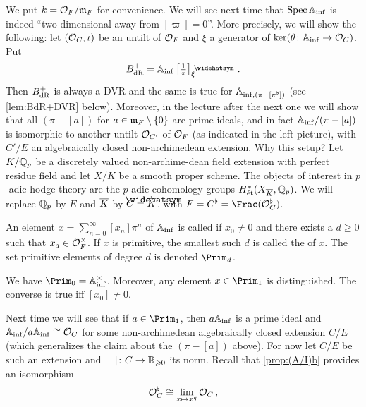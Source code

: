 We put $k=\mathcal{O}_F/\mathfrak{m}_F$ for convenience. We will see next time that $\operatorname{Spec}\mathbb{A}_{\mathrm{inf}}$ is indeed \enquote{two-dimensional away from $[\varpi]=0$}. More precisely, we will show the following: let $(\mathcal{O}_C,\iota)$ be an untilt of $\mathcal{O}_F$ and $\xi$ a generator of $\ker(\theta\colon \IA_\inf\morphism \Oo_C)$. Put
\begin{equation*}
	B_\dR^+=\IA_\inf\left[\textstyle \frac 1\pi\right]_\xi^\complete\,.
\end{equation*}
Then $B_{\mathrm{dR}}^+$ is always a DVR and the same is true for $\mathbb{A}_{\mathrm{inf},(\pi-[\pi^\flat])}$ (see \cref{lem:BdR+DVR} below). Moreover, in the lecture after the next one we will show that all $(\pi-[a])$ for $a\in\mathfrak{m}_F\setminus\{0\}$ are prime ideals, and in fact $\mathbb{A}_{\mathrm{inf}}/(\pi-[a])$ is isomorphic to another untilt $\mathcal{O}_{C'}$ of $\mathcal{O}_F$ (as indicated in the left picture), with $C'/E$ an algebraically closed non-archimedean extension.
Why this setup? Let $K/\mathbb{Q}_p$ be a discretely valued non-archime-dean field extension with perfect residue field and let $X/K$ be a smooth proper scheme.  The objects of interest in $p$-adic hodge theory are the $p$-adic cohomology groups $H_\et^*(X_{\ov{K}},\IQ_p)$. We will replace $\mathbb{Q}_p$ by $E$ and $\ov{K}$ by $C=\roof{\ov{K}}$, with $F=C^\flat=\Frac(\Oo_C^\flat)$.
\begin{defi}
	An element $x=\sum_{n=0}^\infty [x_n]\pi^n$ of $\mathbb{A}_{\mathrm{inf}}$ is called  if $x_0\neq 0$ and there exists a $d\geq 0$ such that $x_d\in \mathcal{O}_F^\times$. If $x$ is primitive, the smallest such $d$ is called the  of $x$. The set primitive elements of degree $d$ is denoted $\Prim_d$.
\end{defi}
\begin{exm}
	We have $\Prim_0=\IA_\inf^\times$. Moreover, any element $x\in \Prim_1$ is distinguished. The converse is true iff $[x_0]\neq 0$.
\end{exm}
Next time we will see that if $a\in \Prim_1$, then $a\mathbb{A}_{\mathrm{inf}}$ is  a prime ideal and $\mathbb{A}_{\mathrm{inf}}/a\mathbb{A}_{\mathrm{inf}}\cong \mathcal{O}_C$ for some non-archimedean algebraically closed extension $C/E$ (which generalizes the claim about the $(\pi-[a])$ above). For now let $C/E$ be such an extension and $|\blank|\colon C\morphism \IR_{\geq 0}$ its norm. Recall that \cref{prop:(A/I)b} provides an isomorphism
\begin{equation*}
	\mathcal{O}_C^\flat\cong \lim_{x\mapsto x^q}\mathcal{O}_C\,,
\end{equation*}

